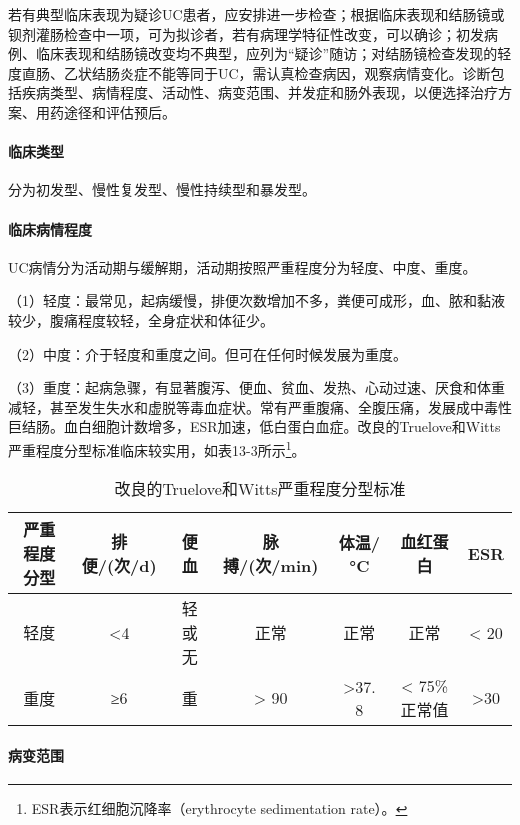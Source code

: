 若有典型临床表现为疑诊UC患者，应安排进一步检查；根据临床表现和结肠镜或钡剂灌肠检查中一项，可为拟诊者，若有病理学特征性改变，可以确诊；初发病例、临床表现和结肠镜改变均不典型，应列为“疑诊”随访；对结肠镜检查发现的轻度直肠、乙状结肠炎症不能等同于UC，需认真检查病因，观察病情变化。诊断包括疾病类型、病情程度、活动性、病变范围、并发症和肠外表现，以便选择治疗方案、用药途径和评估预后。
\paragraph{临床类型}

分为初发型、慢性复发型、慢性持续型和暴发型。
\paragraph{临床病情程度}

UC病情分为活动期与缓解期，活动期按照严重程度分为轻度、中度、重度。

（1）轻度：最常见，起病缓慢，排便次数增加不多，粪便可成形，血、脓和黏液较少，腹痛程度较轻，全身症状和体征少。

（2）中度：介于轻度和重度之间。但可在任何时候发展为重度。

（3）重度：起病急骤，有显著腹泻、便血、贫血、发热、心动过速、厌食和体重减轻，甚至发生失水和虚脱等毒血症状。常有严重腹痛、全腹压痛，发展成中毒性巨结肠。血白细胞计数增多，ESR加速，低白蛋白血症。改良的Truelove和Witts严重程度分型标准临床较实用，如表13-3所示\footnote{ESR表示红细胞沉降率（erythrocyte sedimentation rate）。}。

\begin{table}
    \centering
    \caption{改良的Truelove和Witts严重程度分型标准}
    \label{tab13-3}
    \begin{tabular}{ccccccc}
        \toprule
        严重程度分型 & 排便/(次/d) & 便血   & 脉搏/(次/min) & 体温/°C & 血红蛋白     & ESR  \\
        \midrule
        轻度         & <4          & 轻或无 & 正常          & 正常    & 正常         & < 20 \\
        重度         & ≥6          & 重     & > 90          & >37. 8  & < 75\%正常值 & >30  \\
        \bottomrule
    \end{tabular}
\end{table}

\paragraph{病变范围}


